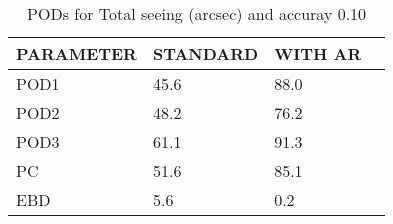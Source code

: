 \begin{table}[]
\begin{center}
\begin{tabular}{|l|l|l|l|}
\hline
\multicolumn{1}{|c|}{\cellcolor[HTML]{C0C0C0}\textbf{PARAMETER}} & \multicolumn{1}{c|}{\cellcolor[HTML]{C0C0C0}\textbf{STANDARD}} & \multicolumn{1}{c|}{\cellcolor[HTML]{C0C0C0}\textbf{WITH AR}} \\
\hline
\cellcolor[HTML]{C0C0C0}POD1  & 45.6                                & 88.0         \\
\cellcolor[HTML]{C0C0C0}POD2  & 48.2                                & 76.2         \\
\cellcolor[HTML]{C0C0C0}POD3  & 61.1                                & 91.3         \\
\cellcolor[HTML]{C0C0C0}PC    & 51.6                                  & 85.1           \\
\cellcolor[HTML]{C0C0C0}EBD   & 5.6                                 & 0.2          \\
\hline
\end{tabular}
\caption{PODs for Total seeing (arcsec) and accuray 0.10}
\end{center}
\end{table}
